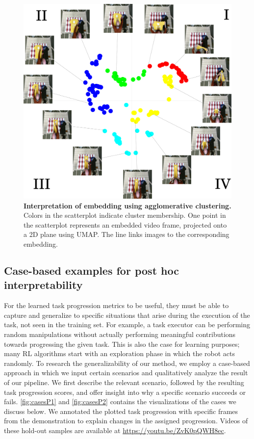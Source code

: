 \documentclass[\home/main.tex]{subfiles}
\begin{document}
\begin{figure}[!htbp]
    \centering
    \includegraphics[width=\textwidth, keepaspectratio]{figures/figs_discussion_wt_572.jpg}
    \caption[Interpretation of embedding using agglomerative clustering]{\textbf{Interpretation of embedding using agglomerative clustering.} Colors in the scatterplot indicate cluster membership. One point in the scatterplot represents an embedded video frame, projected onto a 2D plane using UMAP. The line links images to the corresponding embedding.}
    \label{fig:wt_572}
\end{figure}

\subsection{Case-based examples for post hoc interpretability} \label{subsec:rewards_cases}

For the learned task progression metrics to be useful, they must be able to capture and generalize to specific situations that arise during the execution of the task, not seen in the training set. For example, a task executor can be performing random manipulations without actually performing meaningful contributions towards progressing the given task. This is also the case for learning purposes; many RL algorithms start with an exploration phase in which the robot acts randomly. To research the generalizability of our method, we employ a case-based approach in which we input certain scenarios and qualitatively analyze the result of our pipeline. We first describe the relevant scenario, followed by the resulting task progression scores, and offer insight into why a specific scenario succeeds or fails. \cref{fig:casesP1} and \cref{fig:casesP2} contains the visualizations of the cases we discuss below. We annotated the plotted task progression with specific frames from the demonstration to explain changes in the assigned progression. Videos of these hold-out samples are available at \url{https://youtu.be/ZvK0pQWH8ec}.
\end{document}
